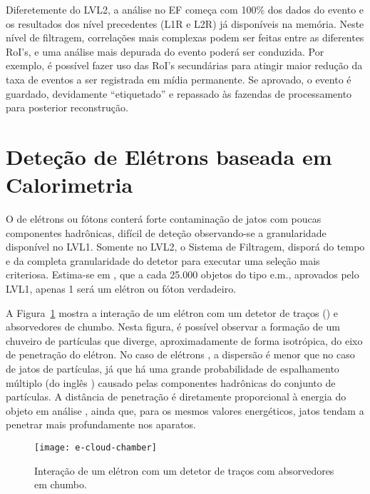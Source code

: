 Diferetemente do LVL2, a análise no EF começa com 100\% dos dados do evento e
os resultados dos nível precedentes (L1R e L2R) já disponíveis na
memória. Neste nível de filtragem, correlações mais complexas podem ser feitas
entre as diferentes RoI's, e uma análise mais depurada do evento poderá ser
conduzida. Por exemplo, é possível fazer uso das RoI's secundárias para
atingir maior redução da taxa de eventos a ser registrada em mídia
permanente. Se aprovado, o evento é guardado, devidamente ``etiquetado'' e
repassado às fazendas de processamento  para posterior
reconstrução.

\section{Deteção de Elétrons baseada em Calorimetria}
\label{sec:e-detection}

O  de elétrons ou fótons conterá forte contaminação de jatos com
poucas componentes hadrônicas, difícil de deteção observando-se a
granularidade disponível no LVL1. Somente no LVL2, o Sistema de Filtragem,
disporá do tempo e da completa granularidade do detetor para executar uma
seleção mais criteriosa. Estima-se em \cite{daqnote00-02}, que a cada 25.000
objetos do tipo e.m., aprovados pelo LVL1, apenas 1 será um elétron ou fóton
verdadeiro. 

A Figura~\ref{fig:e-shower} mostra a interação de um elétron com um detetor de
traços () e absorvedores de chumbo. Nesta figura, é
possível observar a formação de um chuveiro de partículas que diverge,
aproximadamente de forma isotrópica, do eixo de penetração do elétron. No caso
de elétrons \cite{wigmans-book}, a dispersão é menor que no caso de jatos de
partículas, já que há uma grande probabilidade de espalhamento múltiplo (do
inglês ) causado pelas componentes hadrônicas do
conjunto de partículas. A distância de penetração é diretamente proporcional à
energia do objeto em análise \cite{leo, knoll}, ainda que, para os mesmos
valores energéticos, jatos tendam a penetrar mais profundamente nos aparatos.

\begin{figure}
\begin{center}
\texttt{[image: e-cloud-chamber]}
\end{center}
\caption{Interação de um elétron com um detetor de traços com absorvedores em
chumbo.} 
\label{fig:e-shower}
\end{figure}

